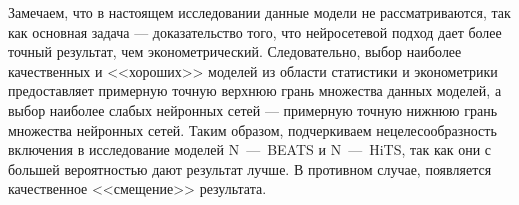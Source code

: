 Замечаем, что в настоящем исследовании данные модели не рассматриваются, так как основная задача --- доказательство того, что нейросетевой подход дает более точный результат, чем эконометрический. Следовательно, выбор наиболее качественных и <<хороших>> моделей из области статистики и эконометрики предоставляет примерную точную верхнюю грань множества данных моделей, а выбор наиболее слабых нейронных сетей --- примерную точную нижнюю грань множества нейронных сетей. Таким образом, подчеркиваем нецелесообразность включения в исследование моделей N~---~BEATS и N~---~HiTS, так как они с большей вероятностью дают результат лучше. В противном случае, появляется качественное <<смещение>> результата.




